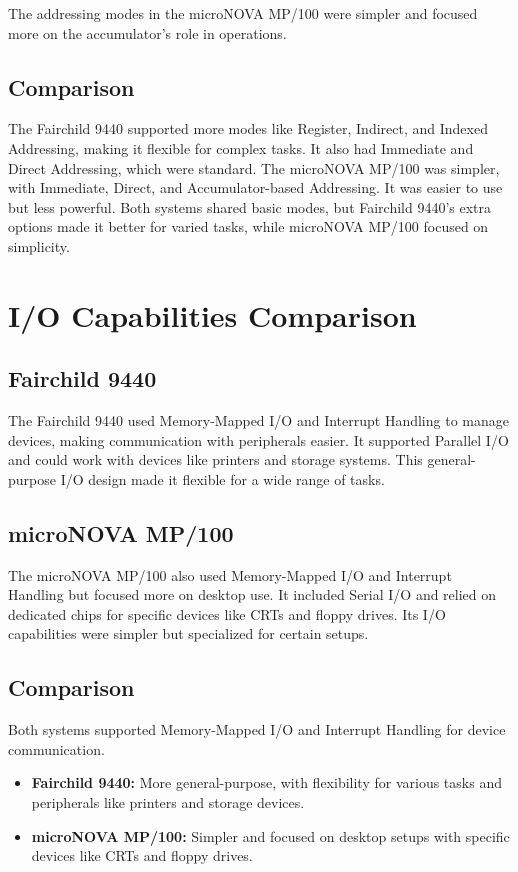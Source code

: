 \documentclass[a4paper,12pt]{article}
\begin{document}
The addressing modes in the microNOVA MP/100 were simpler and focused more on the accumulator's role in operations.

\subsection{Comparison}

The Fairchild 9440 supported more modes like Register, Indirect, and Indexed Addressing, making it flexible for complex tasks. It also had Immediate and Direct Addressing, which were standard.
The microNOVA MP/100 was simpler, with Immediate, Direct, and Accumulator-based Addressing. It was easier to use but less powerful.
Both systems shared basic modes, but Fairchild 9440’s extra options made it better for varied tasks, while microNOVA MP/100 focused on simplicity.



\section{I/O Capabilities Comparison}

\subsection{Fairchild 9440}

The Fairchild 9440 used Memory-Mapped I/O and Interrupt Handling to manage devices, making communication with peripherals easier. It supported Parallel I/O and could work with devices like printers and storage systems. This general-purpose I/O design made it flexible for a wide range of tasks.

\subsection{microNOVA MP/100}

The microNOVA MP/100 also used Memory-Mapped I/O and Interrupt Handling but focused more on desktop use. It included Serial I/O and relied on dedicated chips for specific devices like CRTs and floppy drives. Its I/O capabilities were simpler but specialized for certain setups.

\subsection{Comparison}

Both systems supported Memory-Mapped I/O and Interrupt Handling for device communication.  
\begin{itemize}
    \item \textbf{Fairchild 9440:} More general-purpose, with flexibility for various tasks and peripherals like printers and storage devices.
    \item \textbf{microNOVA MP/100:} Simpler and focused on desktop setups with specific devices like CRTs and floppy drives.
\end{itemize}
\end{document}
